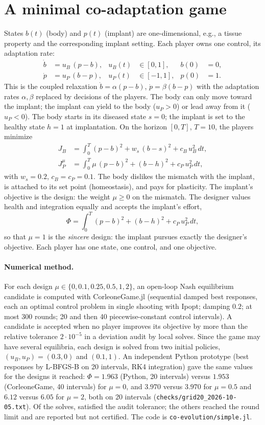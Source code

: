\documentclass[11pt,a4paper]{article}
\begin{document}
\section{A minimal co-adaptation game}
States $b(t)$ (body) and $p(t)$ (implant) are one-dimensional, e.g., a tissue property
and the corresponding implant setting. Each player owns one control, its adaptation rate:
\begin{align}
\dot b &= u_B\,(p-b), & u_B(t)&\in[0,1], & b(0)&=0,\\
\dot p &= u_P\,(b-p), & u_P(t)&\in[-1,1], & p(0)&=1.
\end{align}
This is the coupled relaxation $\dot b=\alpha(p-b)$, $\dot p=\beta(b-p)$ with the
adaptation rates $\alpha,\beta$ replaced by decisions of the players. The body can only
move toward the implant; the implant can yield to the body ($u_P>0$) or lead away from it
($u_P<0$). The body starts in its diseased state $s=0$; the implant is set to the healthy
state $h=1$ at implantation. On the horizon $[0,T]$, $T=10$, the players minimize
\begin{align}
J_B &= \int_0^T (p-b)^2 + w_s\,(b-s)^2 + c_B\,u_B^2\,dt, \\
J_P^\mu &= \int_0^T \mu\,(p-b)^2 + (b-h)^2 + c_P\,u_P^2\,dt,
\end{align}
with $w_s=0.2$, $c_B=c_P=0.1$. The body dislikes the mismatch with the implant, is
attached to its set point (homeostasis), and pays for plasticity. The implant's objective
is the design: the weight $\mu\ge0$ on the mismatch. The designer values health and
integration equally and accepts the implant's effort,
\begin{equation}
\Phi = \int_0^T (p-b)^2 + (b-h)^2 + c_P\,u_P^2\,dt ,
\end{equation}
so that $\mu=1$ is the \emph{sincere} design: the implant pursues exactly the designer's
objective. Each player has one state, one control, and one objective.

\paragraph{Numerical method.}
For each design $\mu\in\{0,0.1,0.25,0.5,1,2\}$, an open-loop Nash equilibrium candidate is
computed with CorleoneGame.jl (sequential damped best responses, each an optimal control
problem in single shooting with Ipopt; damping $0.2$; at most 300 rounds; 20 and then 40
piecewise-constant control intervals). A candidate is accepted when no player improves its
objective by more than the relative tolerance $2\cdot10^{-5}$ in a deviation audit by local
solves. Since the game may have several equilibria, each design is solved from two initial
policies, $(u_B,u_P)=(0.3,0)$ and $(0.1,1)$. An independent Python prototype (best responses
by L-BFGS-B on 20 intervals, RK4 integration) gave the same values for the designs it
reached: $\Phi=1.963$ (Python, 20 intervals) versus $1.953$ (CorleoneGame, 40 intervals)
for $\mu=0$, and $3.970$ versus $3.970$ for $\mu=0.5$ and $6.12$ versus $6.05$ for $\mu=2$, both
on 20 intervals (\texttt{checks/grid20\_2026-10-05.txt}). Of the \resSolves{} solves, \resConverged{} satisfied the audit tolerance; the
others reached the round limit and are reported but not certified.
The code is \texttt{co-evolution/simple.jl}.
\end{document}
